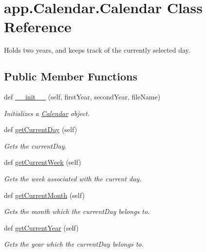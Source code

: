 \hypertarget{classapp_1_1Calendar_1_1Calendar}{}\section{app.\+Calendar.\+Calendar Class Reference}
\label{classapp_1_1Calendar_1_1Calendar}


Holds two years, and keeps track of the currently selected day.  


\subsection*{Public Member Functions}
\begin{DoxyCompactItemize}
\item 
def \hyperlink{classapp_1_1Calendar_1_1Calendar_add1e425ef43b2991978b93e2b4b5b76a}{\+\_\+\+\_\+init\+\_\+\+\_\+} (self, first\+Year, second\+Year, file\+Name)
\begin{DoxyCompactList}\small\item\em Initializes a \hyperlink{classapp_1_1Calendar_1_1Calendar}{Calendar} object. \end{DoxyCompactList}\item 
def \hyperlink{classapp_1_1Calendar_1_1Calendar_aae410a1a0dbb4c0f016d82c39953af97}{get\+Current\+Day} (self)
\begin{DoxyCompactList}\small\item\em Gets the current\+Day. \end{DoxyCompactList}\item 
def \hyperlink{classapp_1_1Calendar_1_1Calendar_afe4714f652fbd416728a294e1031a2ab}{get\+Current\+Week} (self)
\begin{DoxyCompactList}\small\item\em Gets the week associated with the current day. \end{DoxyCompactList}\item 
def \hyperlink{classapp_1_1Calendar_1_1Calendar_ad090e5f4c69719d7e080d1845a92d03a}{get\+Current\+Month} (self)
\begin{DoxyCompactList}\small\item\em Gets the month which the current\+Day belongs to. \end{DoxyCompactList}\item 
def \hyperlink{classapp_1_1Calendar_1_1Calendar_afd772165ac444471a9d1b563c82b8b3a}{get\+Current\+Year} (self)
\begin{DoxyCompactList}\small\item\em Gets the year which the current\+Day belongs to. \end{DoxyCompactList}\item 

\end{DoxyCompactItemize}
